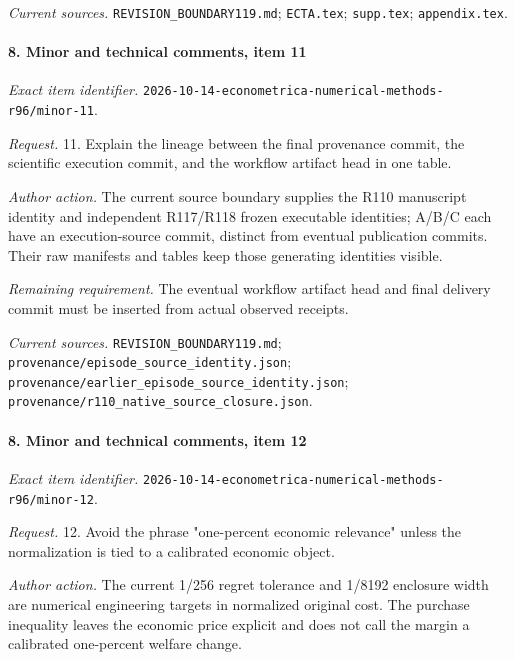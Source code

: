 \par\emph{Current sources.} \nolinkurl{REVISION_BOUNDARY119.md}; \nolinkurl{ECTA.tex}; \nolinkurl{supp.tex}; \nolinkurl{appendix.tex}.

\paragraph{8. Minor and technical comments, item 11}

\emph{Exact item identifier.} \nolinkurl{2026-10-14-econometrica-numerical-methods-r96/minor-11}.

\par\emph{Request.} 11. Explain the lineage between the final provenance commit, the scientific execution commit, and the workflow artifact head in one table.

\par\emph{Author action.} The current source boundary supplies the R110 manuscript identity and independent R117/R118 frozen executable identities; A/\allowbreak{}B/\allowbreak{}C each have an execution-source commit, distinct from eventual publication commits. Their raw manifests and tables keep those generating identities visible.

\par\emph{Remaining requirement.} The eventual workflow artifact head and final delivery commit must be inserted from actual observed receipts.

\par\emph{Current sources.} \nolinkurl{REVISION_BOUNDARY119.md}; \nolinkurl{provenance/episode_source_identity.json}; \nolinkurl{provenance/earlier_episode_source_identity.json}; \nolinkurl{provenance/r110_native_source_closure.json}.

\paragraph{8. Minor and technical comments, item 12}

\emph{Exact item identifier.} \nolinkurl{2026-10-14-econometrica-numerical-methods-r96/minor-12}.

\par\emph{Request.} 12. Avoid the phrase "one-percent economic relevance" unless the normalization is tied to a calibrated economic object.

\par\emph{Author action.} The current 1/256 regret tolerance and 1/8192 enclosure width are numerical engineering targets in normalized original cost. The purchase inequality leaves the economic price explicit and does not call the margin a calibrated one-percent welfare change.

